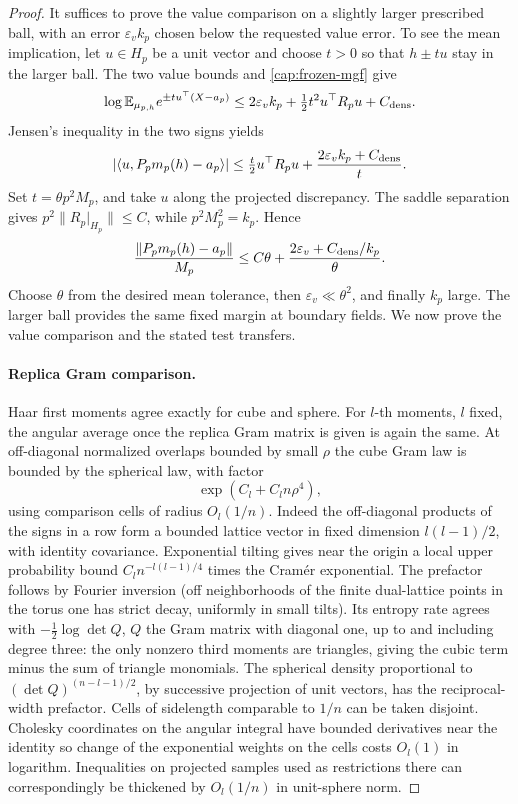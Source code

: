 \begin{proof}
It suffices to prove the value comparison on a slightly larger prescribed
ball, with an error \(\varepsilon_v k_p\) chosen below the requested value
error. To see the mean implication, let \(u\in H_p\) be a unit vector and
choose \(t>0\) so that \(h\pm tu\) stay in the larger ball. The two value
bounds and \eqref{cap:frozen-mgf} give
\[
 \log\mathbb E_{\mu_{p,h}}e^{\pm t u^\top(X-a_p)}
 \le 2\varepsilon_v k_p+\tfrac12t^2u^\top R_pu+C_{\rm dens}.
\]
Jensen's inequality in the two signs yields
\[
 |\langle u,P_pm_p(h)-a_p\rangle|
 \le \tfrac t2u^\top R_pu+
       \frac{2\varepsilon_v k_p+C_{\rm dens}}t.
\]
Set \(t=\theta p^2M_p\), and take \(u\) along the projected discrepancy.
The saddle separation gives \(p^2\|R_p|_{H_p}\|\le C\), while
\(p^2M_p^2=k_p\). Hence
\[
 \frac{\|P_pm_p(h)-a_p\|}{M_p}
 \le C\theta+\frac{2\varepsilon_v+C_{\rm dens}/k_p}{\theta}.
\]
Choose \(\theta\) from the desired mean tolerance, then
\(\varepsilon_v\ll\theta^2\), and finally \(k_p\) large. The larger ball
provides the same fixed margin at boundary fields. We now prove the value
comparison and the stated test transfers.

\paragraph{Replica Gram comparison.}
 Haar first moments agree exactly for cube and sphere. For \(l\)-th moments, \(l\) fixed, the angular average once the replica Gram matrix is given is again the same. At off-diagonal normalized overlaps bounded by small \(\rho\) the cube Gram law is bounded by the spherical law, with factor
\begin{equation}
                       \exp(C_l+C_l n\rho^4),
 \label{cap:gram-comparison}
\end{equation}
using comparison cells of radius \(O_l(1/n)\). Indeed the off-diagonal
products of the signs in a row form a bounded lattice vector in fixed
dimension \(l(l-1)/2\), with identity covariance. Exponential tilting gives
near the origin a local upper probability bound \(C_l n^{-l(l-1)/4}\) times
the Cramér exponential. The prefactor follows by Fourier inversion (off
neighborhoods of the finite dual-lattice points in the torus one has strict
decay, uniformly in small tilts). Its entropy rate agrees with
\(-\frac12\log\det Q\), \(Q\) the Gram matrix with diagonal one, up to and
including degree three: the only nonzero third moments are triangles, giving
the cubic term minus the sum of triangle monomials. The spherical density
proportional to \((\det Q)^{(n-l-1)/2}\), by successive projection of unit
vectors, has the reciprocal-width prefactor. Cells of sidelength comparable to
\(1/n\) can be taken disjoint. Cholesky coordinates on the angular integral
have bounded derivatives near the identity so change of the exponential
weights on the cells costs \(O_l(1)\) in logarithm. Inequalities on projected
samples used as restrictions there can correspondingly be thickened by
\(O_l(1/n)\) in unit-sphere norm.


\end{proof}
